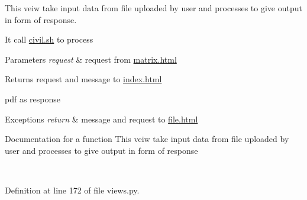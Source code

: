 This veiw take input data from file uploaded by user and processes to give output in form of response. 

It call \hyperlink{civil_8sh}{civil.\+sh} to process 
\begin{DoxyParams}{Parameters}
{\em request} & request from \hyperlink{matrix_8html}{matrix.\+html} \\
\hline
\end{DoxyParams}
\begin{DoxyReturn}{Returns}
request and message to \hyperlink{index_8html}{index.\+html} 

pdf as response 
\end{DoxyReturn}

\begin{DoxyExceptions}{Exceptions}
{\em return} & message and request to \hyperlink{file_8html}{file.\+html} \begin{DoxyVerb}Documentation for a function
This veiw take input data from file uploaded by user and processes
to give output in form of response
\end{DoxyVerb}
 \\
\hline
\end{DoxyExceptions}


Definition at line 172 of file views.\+py.


